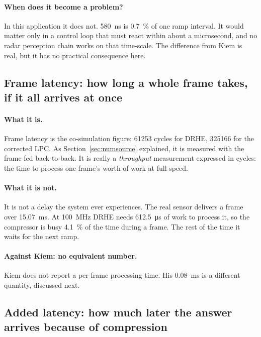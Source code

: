 \paragraph{When does it become a problem?} In this application it does not.
\SI{580}{\nano\second} is \SI{0.7}{\percent} of one ramp interval. It would
matter only in a control loop that must react within about a microsecond, and
no radar perception chain works on that time-scale. The difference from Kiem is
real, but it has no practical consequence here.

\subsection{Frame latency: how long a whole frame takes, if it all arrives at once}

\paragraph{What it is.} Frame latency is the co-simulation figure: \num{61253}
cycles for DRHE, \num{325166} for the corrected LPC. As
Section~\ref{sec:numsource} explained, it is measured with the frame fed
back-to-back. It is really a \emph{throughput} measurement expressed in cycles:
the time to process one frame's worth of work at full speed.

\paragraph{What it is not.} It is not a delay the system ever experiences. The
real sensor delivers a frame over \SI{15.07}{\milli\second}. At
\SI{100}{\mega\hertz} DRHE needs \SI{612.5}{\micro\second} of work to process
it, so the compressor is busy \SI{4.1}{\percent} of the time during a frame. The
rest of the time it waits for the next ramp.

\paragraph{Against Kiem: no equivalent number.} Kiem does not report a
per-frame processing time. His \SI{0.08}{\milli\second} is a different
quantity, discussed next.

\subsection{Added latency: how much later the answer arrives because of compression}
\label{sec:addedlat}

